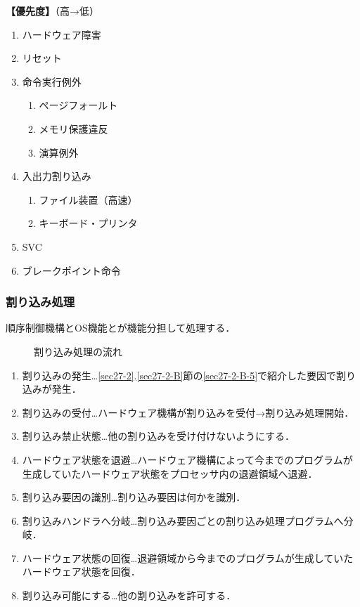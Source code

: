 \noindent\textbf{【優先度】}（高→低）
\begin{enumerate}[label={\color{gray}●}, labelsep=10pt, leftmargin=23pt]
	\item ハードウェア障害
	\item リセット
	\item 命令実行例外
		\begin{enumerate}[label={\color{gray}○}, labelsep=10pt, leftmargin=23pt]
			\item ページフォールト
			\item メモリ保護違反
			\item 演算例外
		\end{enumerate}
	\item 入出力割り込み
		\begin{enumerate}[label={\color{gray}○}, labelsep=10pt, leftmargin=23pt]
			\item ファイル装置（高速）
			\item キーボード・プリンタ
		\end{enumerate}
	\item SVC
	\item ブレークポイント命令
\end{enumerate}



\subsubsection{割り込み処理}\label{sec27-2-B-6}

順序制御機構とOS機能とが機能分担して処理する．

\begin{figure}[H]
	\begin{center}
		\caption{割り込み処理の流れ}
		\label{fig27-1}
	\end{center}
\end{figure}

\begin{enumerate}[label=\arabic*., labelsep=10pt, leftmargin=23pt]
	\item 割り込みの発生…\ref{sec27-2}.\ref{sec27-2-B}節の\ref{sec27-2-B-5}で紹介した要因で割り込みが発生．
	\item 割り込みの受付…ハードウェア機構が割り込みを受付→割り込み処理開始．
	\item 割り込み禁止状態…他の割り込みを受け付けないようにする．
	\item ハードウェア状態を退避…ハードウェア機構によって今までのプログラムが生成していたハードウェア状態をプロセッサ内の退避領域へ退避．
	\item 割り込み要因の識別…割り込み要因は何かを識別．
	\item 割り込みハンドラへ分岐…割り込み要因ごとの割り込み処理プログラムへ分岐．
	\item ハードウェア状態の回復…退避領域から今までのプログラムが生成していたハードウェア状態を回復．
	\item 割り込み可能にする…他の割り込みを許可する．
\end{enumerate}



